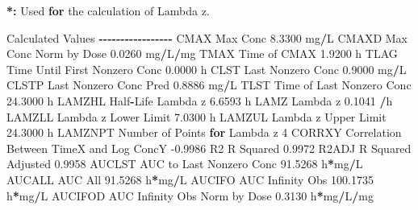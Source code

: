 \documentclass[
  12pt,
]{krantz}
\newenvironment{Shaded}{\begin{snugshade}}{\end{snugshade}}
\newcommand{\ControlFlowTok}[1]{\textcolor[rgb]{0.13,0.29,0.53}{\textbf{#1}}}
\newcommand{\DecValTok}[1]{\textcolor[rgb]{0.00,0.00,0.81}{#1}}
\newcommand{\ErrorTok}[1]{\textcolor[rgb]{0.64,0.00,0.00}{\textbf{#1}}}
\newcommand{\FloatTok}[1]{\textcolor[rgb]{0.00,0.00,0.81}{#1}}
\newcommand{\NormalTok}[1]{#1}
\newcommand{\OperatorTok}[1]{\textcolor[rgb]{0.81,0.36,0.00}{\textbf{#1}}}
\newcommand{\StringTok}[1]{\textcolor[rgb]{0.31,0.60,0.02}{#1}}
\begin{document}
\begin{Shaded}
\begin{Highlighting}[]
\OperatorTok{*}\ErrorTok{:}\StringTok{ }\NormalTok{Used }\ControlFlowTok{for}\NormalTok{ the calculation of Lambda z.}


\NormalTok{Calculated Values}
\OperatorTok{{-}{-}{-}{-}{-}{-}{-}{-}{-}{-}{-}{-}{-}{-}{-}{-}{-}}
\NormalTok{CMAX       Max Conc                                        }\FloatTok{8.3300}\NormalTok{ mg}\OperatorTok{/}\NormalTok{L}
\NormalTok{CMAXD      Max Conc Norm by Dose                           }\FloatTok{0.0260}\NormalTok{ mg}\OperatorTok{/}\NormalTok{L}\OperatorTok{/}\NormalTok{mg}
\NormalTok{TMAX       Time of CMAX                                    }\FloatTok{1.9200}\NormalTok{ h}
\NormalTok{TLAG       Time Until First Nonzero Conc                   }\FloatTok{0.0000}\NormalTok{ h}
\NormalTok{CLST       Last Nonzero Conc                               }\FloatTok{0.9000}\NormalTok{ mg}\OperatorTok{/}\NormalTok{L}
\NormalTok{CLSTP      Last Nonzero Conc Pred                          }\FloatTok{0.8886}\NormalTok{ mg}\OperatorTok{/}\NormalTok{L}
\NormalTok{TLST       Time of Last Nonzero Conc                      }\FloatTok{24.3000}\NormalTok{ h}
\NormalTok{LAMZHL     Half}\OperatorTok{{-}}\NormalTok{Life Lambda z                              }\FloatTok{6.6593}\NormalTok{ h}
\NormalTok{LAMZ       Lambda z                                        }\FloatTok{0.1041} \OperatorTok{/}\NormalTok{h}
\NormalTok{LAMZLL     Lambda z Lower Limit                            }\FloatTok{7.0300}\NormalTok{ h}
\NormalTok{LAMZUL     Lambda z Upper Limit                           }\FloatTok{24.3000}\NormalTok{ h}
\NormalTok{LAMZNPT    Number of Points }\ControlFlowTok{for}\NormalTok{ Lambda z                   }\DecValTok{4}
\NormalTok{CORRXY     Correlation Between TimeX and Log ConcY        }\FloatTok{{-}0.9986} 
\NormalTok{R2         R Squared                                       }\FloatTok{0.9972} 
\NormalTok{R2ADJ      R Squared Adjusted                              }\FloatTok{0.9958} 
\NormalTok{AUCLST     AUC to Last Nonzero Conc                       }\FloatTok{91.5268}\NormalTok{ h}\OperatorTok{*}\NormalTok{mg}\OperatorTok{/}\NormalTok{L}
\NormalTok{AUCALL     AUC All                                        }\FloatTok{91.5268}\NormalTok{ h}\OperatorTok{*}\NormalTok{mg}\OperatorTok{/}\NormalTok{L}
\NormalTok{AUCIFO     AUC Infinity Obs                              }\FloatTok{100.1735}\NormalTok{ h}\OperatorTok{*}\NormalTok{mg}\OperatorTok{/}\NormalTok{L}
\NormalTok{AUCIFOD    AUC Infinity Obs Norm by Dose                   }\FloatTok{0.3130}\NormalTok{ h}\OperatorTok{*}\NormalTok{mg}\OperatorTok{/}\NormalTok{L}\OperatorTok{/}\NormalTok{mg}

\end{Highlighting}
\end{Shaded}
\end{document}
